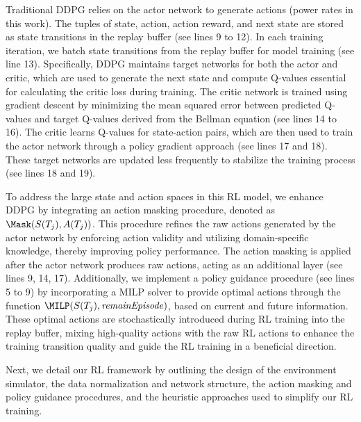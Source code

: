 Traditional DDPG relies on the actor network to generate actions (power rates in this work). The tuples of state, action, action reward, and next state are stored as state transitions in the replay buffer (see lines 9 to 12). In each training iteration, we batch state transitions from the replay buffer for model training (see line 13). Specifically, DDPG maintains target networks for both the actor and critic, which are used to generate the next state and compute Q-values essential for calculating the critic loss during training. The critic network is trained using gradient descent by minimizing the mean squared error between predicted Q-values and target Q-values derived from the Bellman equation (see lines 14 to 16). The critic learns Q-values for state-action pairs, which are then used to train the actor network through a policy gradient approach (see lines 17 and 18). These target networks are updated less frequently to stabilize the training process (see lines 18 and 19). 

To address the large state and action spaces in this RL model, we enhance DDPG by integrating an action masking procedure, denoted as $\Mask(S(T_j), A(T_j))$. This procedure refines the raw actions generated by the actor network by enforcing action validity and utilizing domain-specific knowledge, thereby improving policy performance. The action masking is applied after the actor network produces raw actions, acting as an additional layer (see lines 9, 14, 17). 
Additionally, we implement a policy guidance procedure (see lines 5 to 9) by incorporating a MILP solver to provide optimal actions through the function $\MILP(S(T_j), {\it remainEpisode})$, based on current and future information. These optimal actions are stochastically introduced during RL training into the replay buffer, mixing high-quality actions with the raw RL actions to enhance the training transition quality and guide the RL training in a beneficial direction. 

Next, we detail our RL framework by outlining the design of the environment simulator, the data normalization and network structure, the action masking and policy guidance procedures, and the heuristic approaches used to simplify our RL training. 





